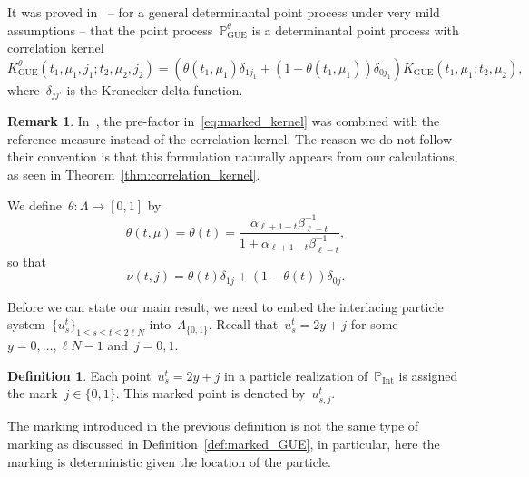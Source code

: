 \documentclass[11pt]{article}
\theoremstyle{plain}
\theoremstyle{definition}
\newtheorem{definition}[theorem]{Definition}
\newtheorem{remark}[theorem]{Remark}
\numberwithin{equation}{section}
\newcommand{\PP}{\mathbb{P}}
\begin{document}
It was proved in~\cite{CG23} -- for a general determinantal point process under very mild assumptions -- that the point process~$\PP_{\operatorname{GUE}}^\theta$ is a determinantal point process with correlation kernel
\begin{equation}\label{eq:marked_kernel}
K_{\operatorname{GUE}}^\theta(t_1,\mu_1,j_1;t_2,\mu_2,j_2)=\left(\theta(t_1,\mu_1)\delta_{1j_1}+(1-\theta(t_1,\mu_1))\delta_{0j_1}\right)K_{\operatorname{GUE}}(t_1,\mu_1;t_2,\mu_2),
\end{equation}
where~$\delta_{jj'}$ is the Kronecker delta function. 
\begin{remark}
In~\cite{CG23}, the pre-factor in~\eqref{eq:marked_kernel} was combined with the reference measure instead of the correlation kernel. The reason we do not follow their convention is that this formulation naturally appears from our calculations, as seen in Theorem~\ref{thm:correlation_kernel}.  
\end{remark}

We define~$\theta:\Lambda\to [0,1]$ by
\begin{equation}\label{eq:theta}
\theta(t,\mu)=\theta(t)=
\frac{\alpha_{\ell+1-t}\beta_{\ell-t}^{-1}}{1+\alpha_{\ell+1-t}\beta_{\ell-t}^{-1}},
\end{equation}
so that
\begin{equation}
\nu(t,j)=\theta(t)\delta_{1j}+(1-\theta(t))\delta_{0j}.
\end{equation}

Before we can state our main result, we need to embed the interlacing particle system~$\{u_s^t\}_{1\leq s\leq t\leq 2\ell N}$ into~$\Lambda_{\{0,1\}}$. Recall that~$u_s^t=2y+j$ for some~$y=0,\dots,\ell N-1$ and~$j=0,1$. 
\begin{definition}\label{def:marked_interlacing}
Each point~$u_s^t=2y+j$ in a particle realization of~$\PP_{\operatorname{Int}}$ is assigned the mark~$j\in\{0,1\}$. This marked point is denoted by~$u_{s,j}^t$. 
\end{definition}
The marking introduced in the previous definition is not the same type of marking as discussed in Definition~\ref{def:marked_GUE}, in particular, here the marking is deterministic given the location of the particle. 
\end{document}
